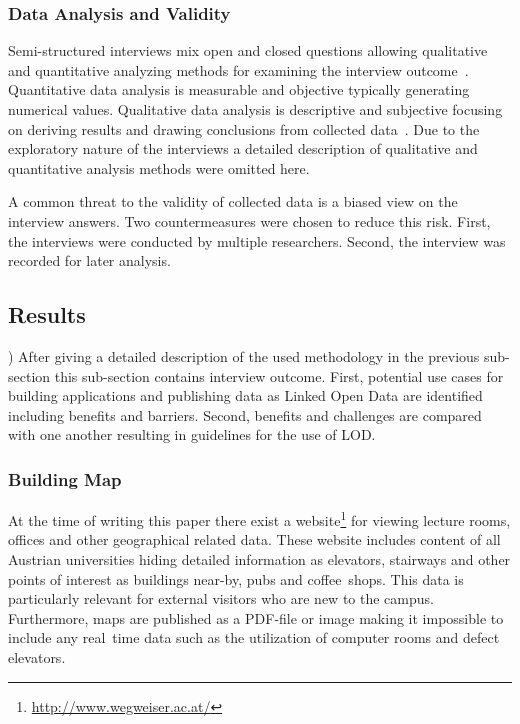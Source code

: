 \documentclass{article}
\begin{document}
\subsubsection{Data Analysis and Validity}
Semi-structured interviews mix open and closed questions allowing qualitative and quantitative analyzing methods for examining the interview outcome~\cite{article:runeson2009-interview-guidelines}. Quantitative data analysis is measurable and objective typically generating numerical values. Qualitative data analysis is descriptive and subjective focusing on deriving results and drawing conclusions from collected data~\cite{article:yin2003case-case-study-research-and-design}. Due to the exploratory nature of the interviews a detailed description of qualitative and quantitative analysis methods were omitted here.  

A common threat to the validity of collected data is a biased view on the interview answers. Two countermeasures were chosen to reduce this risk. First, the interviews were conducted by multiple researchers. Second, the interview was recorded for later analysis. 

\subsection{Results}
\label{sec:results})
After giving a detailed description of the used methodology in the previous sub-section this sub-section contains interview outcome. First, potential use cases for building applications and publishing data as Linked Open Data are identified including benefits and barriers. Second, benefits and challenges are compared with one another resulting in guidelines for the use of LOD. 

\subsubsection{Building Map}
At the time of writing this paper there exist a website\footnote{\url{http://www.wegweiser.ac.at/}} for viewing lecture rooms, offices and other geographical related data. These website includes content of all Austrian universities hiding detailed information as elevators, stairways and other points of interest as buildings near-by, pubs and coffee~shops. 
This data is particularly relevant for external visitors who are new to the campus. Furthermore, maps are published as a PDF-file or image making it impossible to include any real~time data such as the utilization of computer rooms and defect elevators.
\end{document}
